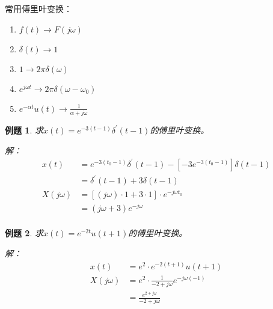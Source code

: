 \documentclass[UTF8]{ctexart}
\newtheorem{example}{例题}[section]
\begin{document}
    常用傅里叶变换：
    \begin{enumerate}
        \item $f(t)              \rightarrow F(j\omega)$
        \item $\delta(t)         \rightarrow 1$
        \item $1                 \rightarrow 2\pi \delta(\omega)$
        \item $e^{j\omega t}     \rightarrow 2\pi \delta(\omega-\omega_0)$
        \item $e^{-\alpha t}u(t) \rightarrow \frac{1}{\alpha + j\omega}$
    \end{enumerate}

    \begin{tcolorbox}[blue]
        \begin{example}
            求$x(t) = e^{-3(t-1)}\delta^\prime(t-1)$的傅里叶变换。

            解：
            \begin{equation*}
                \begin{aligned}
                    x(t)
                    &= e^{-3(t_0-1)}\delta^\prime(t-1) - [-3e^{-3(t_0-1)}]\delta(t-1)\\
                    &= \delta^\prime(t-1) + 3\delta(t-1)\\
                    X(j\omega)
                    &= [(j\omega) \cdot 1 + 3 \cdot 1] \cdot e^{-j\omega t_0}\\
                    &= (j\omega + 3)e^{-j\omega}\\
                \end{aligned}
            \end{equation*}
        \end{example}
    \end{tcolorbox}

    \begin{tcolorbox}[blue]
        \begin{example}
            求$x(t) = e^{-2t}u(t+1)$的傅里叶变换。

            解：
            \begin{equation*}
                \begin{aligned}
                    x(t)
                    &= e^2 \cdot e^{-2(t+1)} u(t+1)\\
                    X(j\omega)
                    &= e^2 \cdot \frac{1}{-2+j\omega} e^{-j\omega(-1)}\\
                    &= \frac{e^{2+j\omega}}{-2+j\omega}\\
                \end{aligned}
            \end{equation*}
        \end{example}
    \end{tcolorbox}
\end{document}
